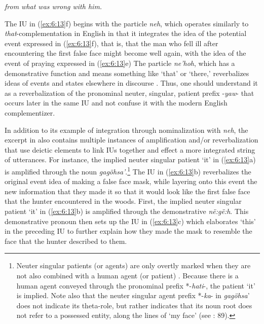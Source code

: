 \textit{from what was wrong with him.}
    \z
\z

\noindent The IU in (\ref{ex:6:13}f) begins with the particle \textit{neh}, which operates similarly to \textit{that}{}-complementation in English in that it integrates the idea of the potential event expressed in (\ref{ex:6:13}f), that is, that the man who fell ill after encountering the first false face might become well again, with the idea of the event of praying expressed in (\ref{ex:6:13}e) The particle \textit{ne’hoh}, which has a demonstrative function and means something like ‘that’ or ‘there,’ reverbalizes ideas of events and states elsewhere in discourse \citep[122--123]{Chafe2014}. Thus, one should understand it as a reverbalization of the pronominal neuter, singular, patient prefix -\textit{yaw}- that occurs later in the same IU and not confuse it with the modern English complementizer.

In addition to its example of integration through nominalization with \textit{neh}, the excerpt in  also contains multiple instances of amplification and/or reverbalization that use deictic elements to link IUs together and effect a more integrated string of utterances. For instance, the implied neuter singular patient ‘it’ in (\ref{ex:6:13}a) is amplified through the noun \textit{gagöhsa’}.\footnote{{Neuter singular patients (or agents) are only overtly marked when they are not also combined with a human agent (or patient) \citep[30--31]{Chafe2014}. Because there is a human agent conveyed through the pronominal prefix *-\textit{hati}-, the patient ‘it’ is implied. Note also that the neuter singular agent prefix *-\textit{ka}- in \textit{gagöhsa}’ does not indicate its theta-role, but rather indicates that its noun root does not refer to a possessed entity, along the lines of ‘my face’ (see \citealt{Chafe2014}: 89).}} The IU in (\ref{ex:6:13}b) reverbalizes the original event idea of making a false face mask, while layering onto this event the new information that they made it so that it would look like the first false face that the hunter encountered in the woods. First, the implied neuter singular patient ‘it’ in (\ref{ex:6:13}b) is amplified through the demonstrative \textit{në:gë:h}. This demonstrative pronoun then sets up the IU in (\ref{ex:6:13}c) which elaborates ‘this’ in the preceding IU to further explain how they made the mask to resemble the face that the hunter described to them.

